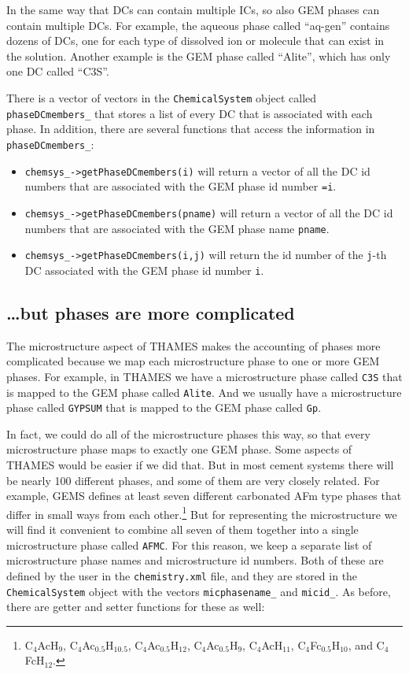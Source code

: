 \documentclass{article}
\begin{document}
In the same way that DCs can contain multiple ICs, so also GEM phases can contain
multiple DCs.  For example, the aqueous phase called ``aq-gen'' contains dozens
of DCs, one for each type of dissolved ion or molecule that can exist in the solution.
Another example is the GEM phase called ``Alite'', which has only one DC called ``C3S''.

There is a vector of vectors in the \verb!ChemicalSystem! object called
\verb!phaseDCmembers_! that stores a list of every DC that is associated with
each phase.  In addition, there are several functions that access the information
in \verb!phaseDCmembers_!:

\begin{itemize}
    \item \verb!chemsys_->getPhaseDCmembers(i)! will return a vector of all the
        DC id numbers that are associated with the GEM phase id number \verb!=i!.
    \item \verb!chemsys_->getPhaseDCmembers(pname)! will return a vector of all the
        DC id numbers that are associated with the GEM phase name \verb!pname!.
    \item \verb!chemsys_->getPhaseDCmembers(i,j)! will return the id number of the
        \verb!j!-th DC associated with the GEM phase id number \verb!i!.
\end{itemize}

\subsection{\ldots but phases are more complicated}
The microstructure aspect of THAMES makes the accounting of phases more
complicated because we map each microstructure phase to one or more
GEM phases.  For example, in THAMES we have a microstructure phase called \verb!C3S!
that is mapped to the GEM phase called \verb!Alite!.  And we usually have a
microstructure phase called \verb!GYPSUM! that is mapped to the GEM phase
called \verb!Gp!.

In fact, we could do all of the microstructure phases this way, so that every
microstructure phase maps to exactly one GEM phase.  Some aspects of THAMES would
be easier if we did that.  But in most cement systems there will be nearly 100
different phases, and some of them are very closely related.  For example,
GEMS defines at least seven different carbonated AFm type
phases that differ in small ways from each
other.\footnote{C$_4$AcH$_9$, C$_4$Ac$_{0.5}$H$_{10.5}$,
    C$_4$Ac$_{0.5}$H$_{12}$, C$_4$Ac$_{0.5}$H$_9$,
C$_4$AcH$_{11}$, C$_4$Fc$_{0.5}$H$_{10}$, and C$_4$FcH$_{12}$.}
But for representing the microstructure we
will find it convenient to combine
all seven of them together into a single microstructure phase called
\verb!AFMC!.  For this reason, we keep a separate list of microstructure phase
names and microstructure id numbers.  Both of these are defined by the user
in the \verb!chemistry.xml! file, and they are stored in the \verb!ChemicalSystem!
object with the vectors \verb!micphasename_! and \verb!micid_!.  As before,
there are getter and setter functions for these as well:
\end{document}
